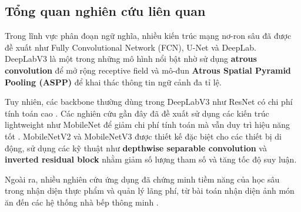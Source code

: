 \subsection{Tổng quan nghiên cứu liên quan}

Trong lĩnh vực phân đoạn ngữ nghĩa, nhiều kiến trúc mạng nơ-ron sâu đã được đề xuất như Fully Convolutional Network (FCN), U-Net và DeepLab. DeepLabV3 là một trong những mô hình nổi bật nhờ sử dụng \textbf{atrous convolution} để mở rộng receptive field và mô-đun \textbf{Atrous Spatial Pyramid Pooling (ASPP)} để khai thác thông tin ngữ cảnh đa tỉ lệ.

Tuy nhiên, các backbone thường dùng trong DeepLabV3 như ResNet có chi phí tính toán cao \cite{he2015residual}. Các nghiên cứu gần đây đã đề xuất sử dụng các kiến trúc lightweight như MobileNet để giảm chi phí tính toán mà vẫn duy trì hiệu năng tốt \cite{dong2020mobilenetv2}. MobileNetV2 và MobileNetV3 được thiết kế đặc biệt cho các thiết bị di động, sử dụng các kỹ thuật như \textbf{depthwise separable convolution} và \textbf{inverted residual block} nhằm giảm số lượng tham số và tăng tốc độ suy luận.

Ngoài ra, nhiều nghiên cứu ứng dụng đã chứng minh tiềm năng của học sâu trong nhận diện thực phẩm và quản lý lãng phí, từ bài toán nhận diện ảnh món ăn đến các hệ thống nhà bếp thông minh \cite{yanai2015foodimage, lubura2022foodrecognition, chakraborty2024aikitchen}.
